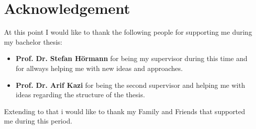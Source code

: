 \chapter*{Acknowledgement}
\label{acknowledgement}
At this point I would like to thank the following people for supporting me during my bachelor thesis:

\begin{itemize}
\item \textbf{Prof. Dr. Stefan Hörmann} for being my supervisor during this time and for allways helping me with new ideas and approaches.
\item \textbf{Prof. Dr. Arif Kazi} for being the second supervisor and helping me with ideas regarding the structure of the thesis.
\end{itemize}

Extending to that i would like to thank my Family and Friends that supported me during this period.

